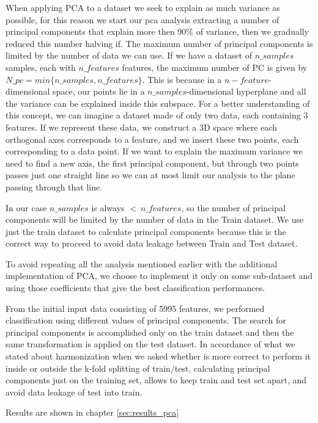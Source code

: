 \documentclass[11pt]{report}
\begin{document}
When applying PCA to a dataset we seek to explain as much variance as possible, for this reason we start our pca analysis extracting a number of principal components that explain more then 90$\%$ of variance, then we gradually reduced this number halving if.
The maximum number of principal components is limited by the number of data we can use. If we have a dataset of $n\_samples$ samples, each with $n\_features$ features, the maximum number of PC is given by $N\_pc = min\{n\_samples, n\_features\}$.
This is because in a $n-feature$-dimensional space, our points lie in a $n\_samples$-dimensional hyperplane and all the variance can be explained inside this subspace.
For a better understanding of this concept, we can imagine a dataset made of only two data, each containing 3 features. If we represent these data, we construct a 3D space where each orthogonal axes corresponds to a feature, and we insert these two points, each corresponding to a data point.
If we want to explain the maximum variance we need to find a new axis, the first principal component, but through two points passes just one straight line so we can at most limit our analysis to the plane passing through that line.

In our case $n\_samples$ is always $< \ n\_features$, so the number of principal components will be limited by the number of data in the Train dataset.
We use just the train dataset to calculate principal components because this is the correct way to proceed to avoid data leakage between Train and Test dataset.

To avoid repeating all the analysis mentioned earlier with the additional implementation of PCA, we choose to implement it only on some sub-dataset and using those coefficients that give the best classification performances.

From the initial input data consisting of 5995 features, we performed classification using different values of principal components. The search for principal components is accomplished only on the train dataset and then the same transformation is applied on the test dataset. In accordance of what we stated about harmonization when we asked whether is more correct to perform it inside or outside the k-fold splitting of train/test, calculating principal components just on the training set, allows to keep train and test set apart, and avoid data leakage of test into train.

Results are shown in chapter \ref{sec:results_pca}
\end{document}
